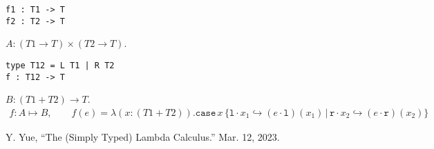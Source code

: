 \documentclass{article}
\theoremstyle{definition}
\newcommand{\lp}{\cdot \mathtt{l}}
\newcommand{\rp}{\cdot \mathtt{r}}
\newcommand{\li}{\mathtt{l}\cdot}
\newcommand{\ri}{\mathtt{r}\cdot}
\newcommand{\case}[5]{\mathtt{case}\, #1\, \{\li #2\hookrightarrow #3\, |\, \ri #4\hookrightarrow #5\}}
\begin{document}
\begin{enumerate}
\begin{mdframed}[backgroundcolor=bg]
\begin{verbatim}
f1 : T1 -> T
f2 : T2 -> T
        \end{verbatim}
          \end{mdframed}
          $A: (T1 \rightarrow T) \times (T2 \rightarrow T)$.
          \begin{mdframed}[backgroundcolor=bg]
              \begin{verbatim}
type T12 = L T1 | R T2
f : T12 -> T
        \end{verbatim}
          \end{mdframed}
          $B: (T1 + T2) \rightarrow T$.
          \begin{align*}
              f: A \mapsto B,\qquad f(e) = \lambda (x:(T1+T2)). \case{x}{x_1}{(e\lp)(x_1)}{x_2}{(e\rp)(x_2)}
          \end{align*}
\end{enumerate}

\begin{thebibliography}{9}
     Y. Yue, “The (Simply Typed) Lambda Calculus.” Mar. 12, 2023.
\end{thebibliography}
\end{document}
